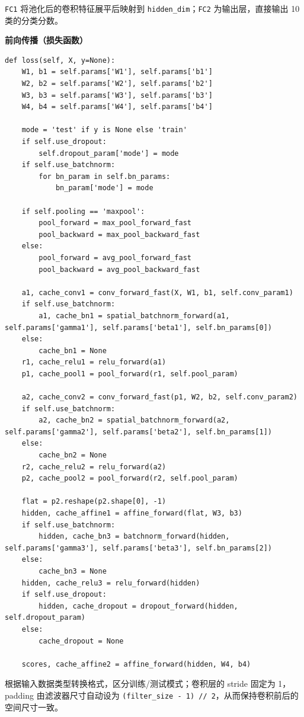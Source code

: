 \lstinline|FC1| 将池化后的卷积特征展平后映射到 \lstinline|hidden_dim|；\lstinline|FC2| 为输出层，直接输出 10 类的分类分数。

\textbf{前向传播（损失函数）}

\begin{lstlisting}[style=cleanpython]
def loss(self, X, y=None):
    W1, b1 = self.params['W1'], self.params['b1']
    W2, b2 = self.params['W2'], self.params['b2']
    W3, b3 = self.params['W3'], self.params['b3']
    W4, b4 = self.params['W4'], self.params['b4']

    mode = 'test' if y is None else 'train'
    if self.use_dropout:
        self.dropout_param['mode'] = mode
    if self.use_batchnorm:
        for bn_param in self.bn_params:
            bn_param['mode'] = mode

    if self.pooling == 'maxpool':
        pool_forward = max_pool_forward_fast
        pool_backward = max_pool_backward_fast
    else:
        pool_forward = avg_pool_forward_fast
        pool_backward = avg_pool_backward_fast

    a1, cache_conv1 = conv_forward_fast(X, W1, b1, self.conv_param1)
    if self.use_batchnorm:
        a1, cache_bn1 = spatial_batchnorm_forward(a1, self.params['gamma1'], self.params['beta1'], self.bn_params[0])
    else:
        cache_bn1 = None
    r1, cache_relu1 = relu_forward(a1)
    p1, cache_pool1 = pool_forward(r1, self.pool_param)

    a2, cache_conv2 = conv_forward_fast(p1, W2, b2, self.conv_param2)
    if self.use_batchnorm:
        a2, cache_bn2 = spatial_batchnorm_forward(a2, self.params['gamma2'], self.params['beta2'], self.bn_params[1])
    else:
        cache_bn2 = None
    r2, cache_relu2 = relu_forward(a2)
    p2, cache_pool2 = pool_forward(r2, self.pool_param)

    flat = p2.reshape(p2.shape[0], -1)
    hidden, cache_affine1 = affine_forward(flat, W3, b3)
    if self.use_batchnorm:
        hidden, cache_bn3 = batchnorm_forward(hidden, self.params['gamma3'], self.params['beta3'], self.bn_params[2])
    else:
        cache_bn3 = None
    hidden, cache_relu3 = relu_forward(hidden)
    if self.use_dropout:
        hidden, cache_dropout = dropout_forward(hidden, self.dropout_param)
    else:
        cache_dropout = None

    scores, cache_affine2 = affine_forward(hidden, W4, b4)
\end{lstlisting}

根据输入数据类型转换格式，区分训练/测试模式；卷积层的 stride 固定为 1，padding 由滤波器尺寸自动设为 \lstinline|(filter_size - 1) // 2|，从而保持卷积前后的空间尺寸一致。

